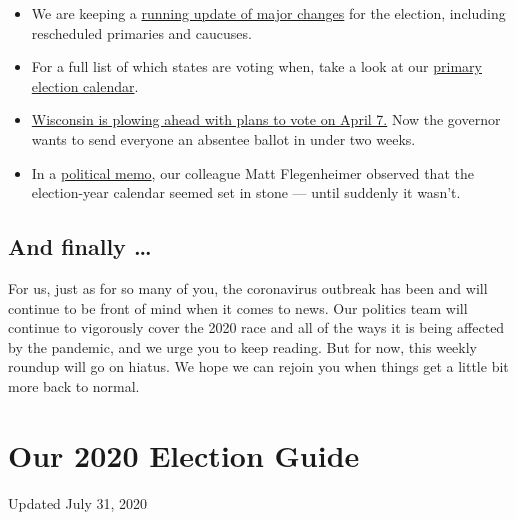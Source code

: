 \begin{itemize}
\item
  We are keeping a
  \href{https://www.nytimes.com/article/2020-campaign-primary-calendar-coronavirus.html?action=click\&module=RelatedLinks\&pgtype=Article}{running
  update of major changes} for the election, including rescheduled
  primaries and caucuses.
\item
  For a full list of which states are voting when, take a look at our
  \href{https://www.nytimes.com/interactive/2019/us/elections/2020-presidential-election-calendar.html}{primary
  election calendar}.
\item
  \href{https://www.nytimes.com/2020/03/27/us/politics/wisconsin-primary-coronavirus.html}{Wisconsin
  is plowing ahead with plans to vote on April 7.} Now the governor
  wants to send everyone an absentee ballot in under two weeks.
\item
  In a
  \href{https://www.nytimes.com/2020/03/24/us/politics/coronavirus-2020-election-primary.html}{political
  memo}, our colleague Matt Flegenheimer observed that the election-year
  calendar seemed set in stone --- until suddenly it wasn't.
\end{itemize}

\hypertarget{and-finally-}{%
\subsection{And finally \ldots{}}\label{and-finally-}}

For us, just as for so many of you, the coronavirus outbreak has been
and will continue to be front of mind when it comes to news. Our
politics team will continue to vigorously cover the 2020 race and all of
the ways it is being affected by the pandemic, and we urge you to keep
reading. But for now, this weekly roundup will go on hiatus. We hope we
can rejoin you when things get a little bit more back to normal.

\hypertarget{our-2020-election-guide}{%
\section{Our 2020 Election Guide}\label{our-2020-election-guide}}

Updated July 31, 2020

